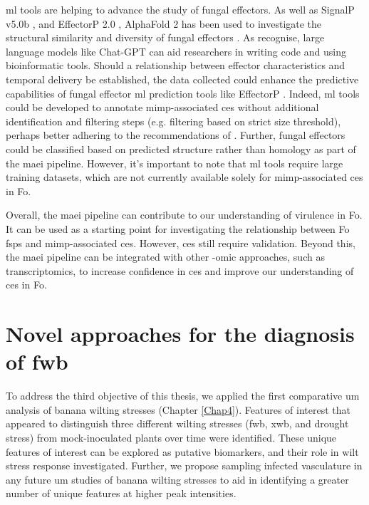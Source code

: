 \Acf{ml} tools are helping to advance the study of fungal effectors. As well as SignalP v5.0b \parencite{Petersen2011}, and EffectorP 2.0 \parencite{Sperschneider2018},  AlphaFold 2 has been used to investigate the structural similarity and diversity of fungal effectors \parencite{Seong2023}. As \textcite{Sarsa2022} recognise, large language models like Chat-GPT \parencite{OpenAI2024} can aid researchers in writing code and using bioinformatic tools.  Should a relationship between effector characteristics and temporal delivery be established, the data collected could enhance the predictive capabilities of fungal effector \ac{ml} prediction tools like EffectorP \parencite{Sperschneider2022}. Indeed, \ac{ml} tools could be developed to annotate \ac{mimp}-associated \acp{ce} without additional identification and filtering steps (e.g. filtering based on strict size threshold), perhaps better adhering to the recommendations of \textcite{Sperschneider2015, LoPresti2015, Todd2022}. Further, fungal effectors could be classified based on predicted structure rather than homology as part of the \ac{maei} pipeline. However, it's important to note that \ac{ml} tools require large training datasets, which are not currently available solely for \ac{mimp}-associated \acp{ce} in \ac{Fo}. 

Overall, the \ac{maei} pipeline can contribute to our understanding of virulence in \ac{Fo}. It can be used as a starting point for investigating the relationship between \ac{Fo} \acp{fsp} and \ac{mimp}-associated \acp{ce}. However, \acp{ce} still require validation. Beyond this, the \ac{maei} pipeline can be integrated with other -omic approaches, such as transcriptomics, to increase confidence in \acp{ce} and improve our understanding of \acp{ce} in \ac{Fo}. 

\section{Novel approaches for the diagnosis of \acl{fwb}}

To address the third objective of this thesis, we applied the first comparative \acf{um} analysis of banana wilting stresses (Chapter \ref{Chap4}). Features of interest that appeared to distinguish three different wilting stresses (\acl{fwb}, \acf{xwb}, and drought stress) from mock-inoculated plants over time were identified. These unique features of interest can be explored as putative biomarkers, and their role in wilt stress response investigated. Further, we propose sampling infected vasculature in any future \ac{um} studies of banana wilting stresses to aid in identifying a greater number of unique features at higher peak intensities. 

